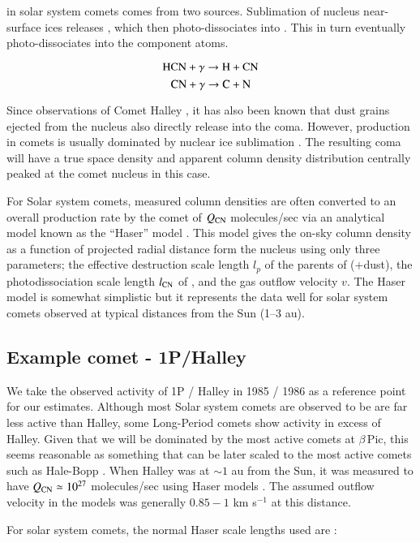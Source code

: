 \documentclass{aa}
\newcommand{\kms}{km s$^{-1}$}
\newcommand{\bp}{$\beta$\,Pic}
\begin{document}
 in solar system comets comes from two sources.
%
Sublimation of nucleus near-surface ices releases , which then photo-dissociates into .
%
This in turn eventually photo-dissociates into the component atoms.

$$\ce{HCN} +\gamma \rightarrow \ce{H}+\ce{CN}$$
$$\ce{CN} + \gamma \rightarrow \ce{C}+\ce{N}$$

Since observations of Comet Halley \citep{AHearn1986}, it has also been known that dust grains ejected from the nucleus also directly release  into the coma.
%
However,  production in comets is usually dominated by nuclear ice sublimation \citep{Fray2005}.
%
The resulting  coma will have a true space density and apparent column density distribution centrally peaked at the comet nucleus in this case.

For Solar system comets, measured  column densities are often converted to an overall production rate by the comet of $Q_{\ce{CN}}$ molecules/sec via an analytical model known as the ``Haser'' model \citep{Haser2020}.
%
This model gives the on-sky column density as a function of projected radial distance form the nucleus using only three parameters; the effective destruction scale length $l_p$ of the parents of  (+dust), the photodissociation scale length $l_{\ce{CN}}$ of , and the gas outflow velocity $v$.
%
The Haser model is somewhat simplistic but it represents the data well for solar system comets observed at typical distances from the Sun (1--3 au).

\subsection{Example comet - 1P/Halley}

We take the observed activity of 1P / Halley in 1985 / 1986 as a reference point for our estimates.
%
Although most Solar system comets are observed to be are far less active than Halley, some Long-Period comets show activity in excess of Halley.
%
Given that we will be dominated by the most active comets at \bp{}, this seems reasonable as something that can be later scaled to the most active comets such as Hale-Bopp \citep{Schleicher2024}.
%
When Halley was at $\sim 1$ au from the Sun, it was measured to have $Q_{\ce{CN}}\simeq 10^{27}$ molecules/sec using Haser models \citep{AHearn1995}.
%
The assumed outflow velocity in the models was generally  $0.85 - 1$ \kms{} at this distance.

For solar system comets, the normal Haser scale lengths used are \citep{Cochran86,AHearn1995} :
\end{document}
